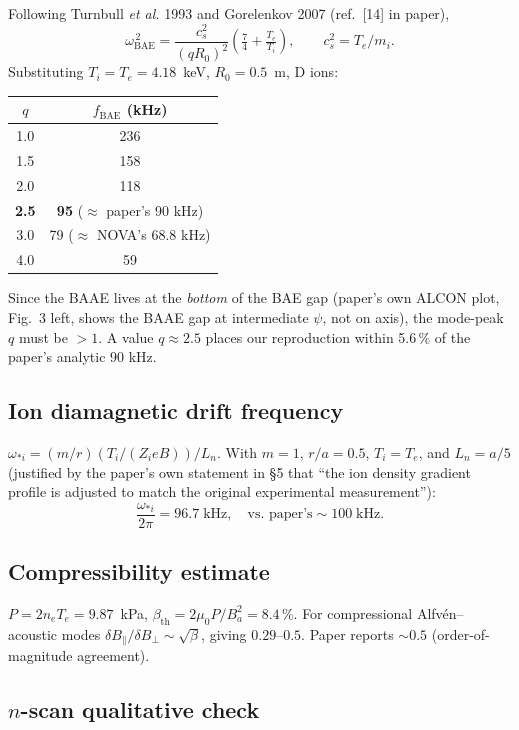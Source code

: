 \documentclass[11pt]{article}
\begin{document}
Following Turnbull \emph{et al.} 1993 and Gorelenkov 2007 (ref.\ [14] in paper),
\[
\omega_{\mathrm{BAE}}^{\,2} = \frac{c_s^2}{(qR_0)^2}\left(\tfrac{7}{4}+\tfrac{T_e}{T_i}\right),\qquad c_s^2 = T_e/m_i .
\]
Substituting $T_i = T_e = 4.18$~keV, $R_0=0.5$~m, D ions:

\begin{center}
\begin{tabular}{cc}
\toprule
$q$ & $f_{\mathrm{BAE}}$ (kHz) \\
\midrule
1.0 & 236 \\
1.5 & 158 \\
2.0 & 118 \\
\textbf{2.5} & \textbf{95} \quad ($\approx$ paper's 90 kHz) \\
3.0 & 79 \quad ($\approx$ NOVA's 68.8 kHz) \\
4.0 & 59 \\
\bottomrule
\end{tabular}
\end{center}

Since the BAAE lives at the \emph{bottom} of the BAE gap (paper's own ALCON plot, Fig.~3 left, shows the BAAE gap at intermediate $\psi$, not on axis), the mode-peak $q$ must be $>1$. A value $q\approx2.5$ places our reproduction within 5.6\,\% of the paper's analytic 90 kHz.

\subsection{Ion diamagnetic drift frequency}

$\omega_{*i} = (m/r)(T_i/(Z_i e B))/L_n$. With $m=1$, $r/a=0.5$, $T_i=T_e$, and $L_n = a/5$ (justified by the paper's own statement in \S5 that ``the ion density gradient profile is adjusted to match the original experimental measurement''):
\[
\frac{\omega_{*i}}{2\pi} = 96.7\;\text{kHz},\quad\text{vs.\ paper's} \sim100\;\text{kHz}.
\]

\subsection{Compressibility estimate}

$P = 2 n_e T_e = 9.87$~kPa, $\beta_{\mathrm{th}} = 2\mu_0 P/B_a^2 = 8.4\,\%$. For compressional Alfv\'en--acoustic modes $\delta B_\parallel/\delta B_\perp \sim \sqrt{\beta}$, giving $0.29$--$0.5$. Paper reports $\sim0.5$ (order-of-magnitude agreement).

\subsection{$n$-scan qualitative check}
\end{document}
